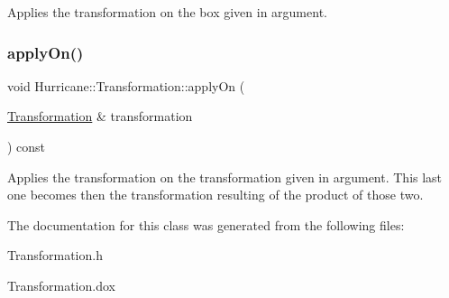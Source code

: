 Applies the transformation on the box given in argument. \mbox{\label{classHurricane_1_1Transformation_a3ac2c40977ecf061b4316ecedc87918a}} 
\subsubsection{\texorpdfstring{apply\+On()}{applyOn()}\hspace{0.1cm}{\footnotesize\ttfamily [4/4]}}
{\footnotesize\ttfamily void Hurricane\+::\+Transformation\+::apply\+On (\begin{DoxyParamCaption}\item[{\hyperlink{classHurricane_1_1Transformation}{Transformation} \&}]{transformation }\end{DoxyParamCaption}) const}

Applies the transformation on the transformation given in argument. This last one becomes then the transformation resulting of the product of those two. 

The documentation for this class was generated from the following files\+:\begin{DoxyCompactItemize}
\item 
Transformation.\+h\item 
Transformation.\+dox\end{DoxyCompactItemize}
